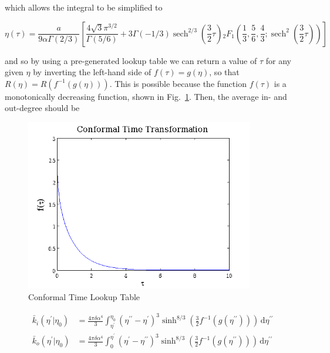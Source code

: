 \documentclass[preprint,notitlepage,amsmath,amssymb,floatfix]{revtex4-1}
\DeclareMathOperator{\sech}{sech}
\begin{document}
\noindent which allows the integral to be simplified to

\begin{equation}
\eta\left(\tau\right) = \frac{a}{9\alpha\Gamma\left(2/3\right)}\left[\frac{4\sqrt{3}\pi^{3/2}}{\Gamma\left(5/6\right)} + 3\Gamma\left(-1/3\right)\sech^{2/3}\left(\frac{3}{2}\tau\right){}_2F_1\left(\frac{1}{3},\frac{5}{6},\frac{4}{3};\sech^2\left(\frac{3}{2}\tau\right)\right)\right]
\end{equation}

\noindent and so by using a pre-generated lookup table we can return a value of $\tau$ for any given $\eta$ by inverting the left-hand side of $f\left(\tau\right) = g\left(\eta\right)$, so that $R\left(\eta\right) = R\left(f^{-1}\left(g\left(\eta\right)\right)\right)$.  This is possible because the function $f\left(\tau\right)$ is a monotonically decreasing function, shown in Fig.~\ref{fig:f_tau_tau}.
Then, the average in- and out-degree should be

\begin{figure}
\includegraphics[width=10cm]{figures/ctuc.png}
\caption{Conformal Time Lookup Table}
\label{fig:f_tau_tau}
\centering
\end{figure}

\begin{align}
\bar{k}_i\left(\eta^\prime|\eta_0\right) &= \frac{4\pi\delta\alpha^4}{3}\int_{\eta^\prime}^{\eta_0}\!\left(\eta^{\prime\prime}-\eta^\prime\right)^3\sinh^{8/3}\left(\frac{3}{2}f^{-1}\left(g\left(\eta^{\prime\prime}\right)\right)\right)\,\mathrm d\eta^{\prime\prime} \\
\bar{k}_o\left(\eta^\prime|\eta_0\right) &= \frac{4\pi\delta\alpha^4}{3}\int_0^{\eta^\prime}\!\left(\eta^\prime-\eta^{\prime\prime}\right)^3\sinh^{8/3}\left(\frac{3}{2}f^{-1}\left(g\left(\eta^{\prime\prime}\right)\right)\right)\,\mathrm d\eta^{\prime\prime}
\end{align}
\end{document}
